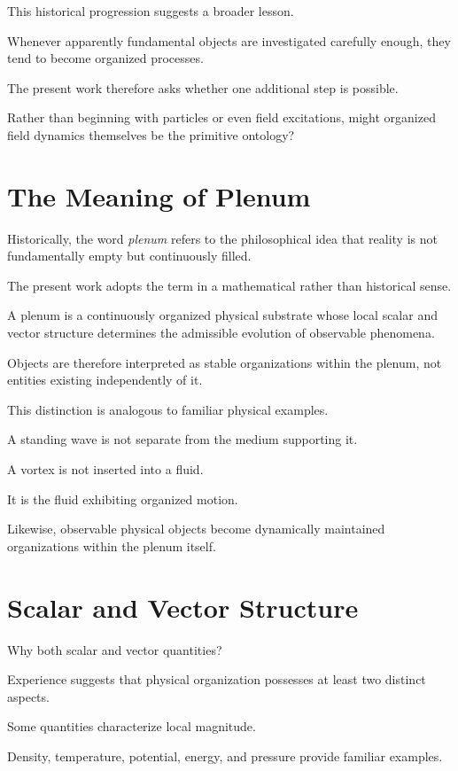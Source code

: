 \documentclass[11pt,oneside]{book}
\numberwithin{equation}{chapter}
\theoremstyle{definition}
\theoremstyle{plain}
\begin{document}
This historical progression suggests a broader lesson.

Whenever apparently fundamental objects are investigated carefully enough,
they tend to become organized processes.

The present work therefore asks whether one additional step is possible.

Rather than beginning with particles or even field excitations, might
organized field dynamics themselves be the primitive ontology?

\section{The Meaning of Plenum}

Historically, the word \emph{plenum} refers to the philosophical idea that
reality is not fundamentally empty but continuously filled.

The present work adopts the term in a mathematical rather than historical
sense.

A plenum is a continuously organized physical substrate whose local scalar
and vector structure determines the admissible evolution of observable
phenomena.

Objects are therefore interpreted as stable organizations within the
plenum, not entities existing independently of it.

This distinction is analogous to familiar physical examples.

A standing wave is not separate from the medium supporting it.

A vortex is not inserted into a fluid.

It is the fluid exhibiting organized motion.

Likewise, observable physical objects become dynamically maintained
organizations within the plenum itself.

\section{Scalar and Vector Structure}

Why both scalar and vector quantities?

Experience suggests that physical organization possesses at least two
distinct aspects.

Some quantities characterize local magnitude.

Density, temperature, potential, energy, and pressure provide familiar
examples.
\end{document}
